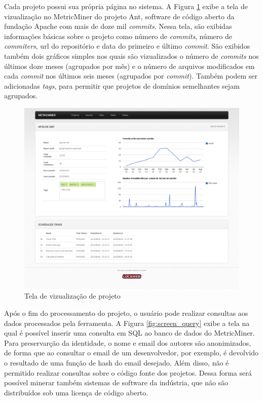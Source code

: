 \documentclass[a4paper, 12pt, twoside]{book}
\begin{document}
        Cada projeto possui sua própria página no sistema. A Figura \ref{fig:screen_projeto} exibe a 
        tela de vizualização no MetricMiner do projeto Ant, software de código aberto da fundação     
        Apache com mais de doze mil \textit{commits}. Nessa tela, são exibidas informações básicas 
        sobre o projeto como número de \textit{commits}, número de \textit{commiters}, url do 
        repositório e data do primeiro e último \textit{commit}. São exibidos também dois gráficos 
        simples nos quais são vizualizados o número de \textit{commits} nos últimos doze meses 
        (agrupados por mês) e o número de arquivos modificados em cada \textit{commit} nos últimos 
        seis meses (agrupados por \textit{commit}). Também podem ser adicionadas \textit{tags},
        para permitir que projetos de domínios semelhantes sejam agrupados.
    
        \begin{figure}[ht]
            \centering
            \includegraphics[width=1.00\textwidth]{img/ant.png}
            \caption{Tela de vizualização de projeto}
            \label{fig:screen_projeto}
        \end{figure}

        Após o fim do processamento do projeto, o usuário pode realizar consultas aos dados processados pela ferramenta. A Figura \ref{fig:screen_query} exibe a tela na qual é possível inserir uma consulta em SQL ao banco de dados do MetricMiner. Para preservarção da identidade, o nome e email dos autores são anonimizados, de forma que ao consultar o email de um desenvolvedor, por exemplo, é devolvido o resultado de uma função de hash do email desejado. Além disso, não é permitido realizar consultas sobre o código fonte dos projetos. Dessa forma será possível minerar também sistemas de software da indústria, que não são distribuídos sob uma licença de código aberto.
\end{document}
